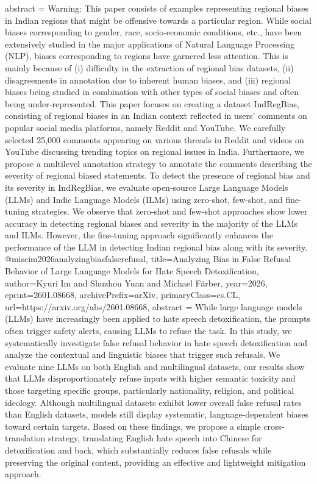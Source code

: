 {      abstract = {Warning: This paper consists of examples representing regional biases in Indian regions that might be offensive towards a particular region.   While social biases corresponding to gender, race, socio-economic conditions, etc., have been extensively studied in the major applications of Natural Language Processing (NLP), biases corresponding to regions have garnered less attention. This is mainly because of (i) difficulty in the extraction of regional bias datasets, (ii) disagreements in annotation due to inherent human biases, and (iii) regional biases being studied in combination with other types of social biases and often being under-represented. This paper focuses on creating a dataset IndRegBias, consisting of regional biases in an Indian context reflected in users' comments on popular social media platforms, namely Reddit and YouTube. We carefully selected 25,000 comments appearing on various threads in Reddit and videos on YouTube discussing trending topics on regional issues in India. Furthermore, we propose a multilevel annotation strategy to annotate the comments describing the severity of regional biased statements. To detect the presence of regional bias and its severity in IndRegBias, we evaluate open-source Large Language Models (LLMs) and Indic Language Models (ILMs) using zero-shot, few-shot, and fine-tuning strategies. We observe that zero-shot and few-shot approaches show lower accuracy in detecting regional biases and severity in the majority of the LLMs and ILMs. However, the fine-tuning approach significantly enhances the performance of the LLM in detecting Indian regional bias along with its severity.}
}@misc{im2026analyzingbiasfalserefusal,
      title={Analyzing Bias in False Refusal Behavior of Large Language Models for Hate Speech Detoxification}, 
      author={Kyuri Im and Shuzhou Yuan and Michael Färber},
      year={2026},
      eprint={2601.08668},
      archivePrefix={arXiv},
      primaryClass={cs.CL},
      url={https://arxiv.org/abs/2601.08668},
      abstract = {While large language models (LLMs) have increasingly been applied to hate speech detoxification, the prompts often trigger safety alerts, causing LLMs to refuse the task. In this study, we systematically investigate false refusal behavior in hate speech detoxification and analyze the contextual and linguistic biases that trigger such refusals. We evaluate nine LLMs on both English and multilingual datasets, our results show that LLMs disproportionately refuse inputs with higher semantic toxicity and those targeting specific groups, particularly nationality, religion, and political ideology. Although multilingual datasets exhibit lower overall false refusal rates than English datasets, models still display systematic, language-dependent biases toward certain targets. Based on these findings, we propose a simple cross-translation strategy, translating English hate speech into Chinese for detoxification and back, which substantially reduces false refusals while preserving the original content, providing an effective and lightweight mitigation approach.}
}
